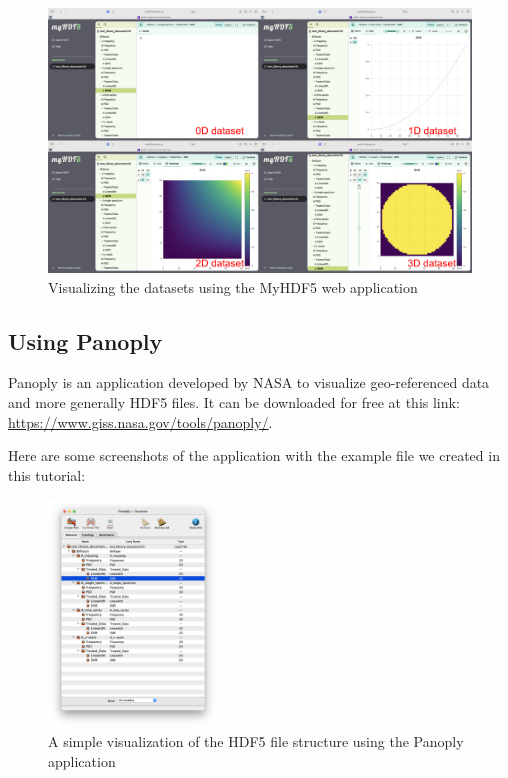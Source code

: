 \documentclass{article}
\begin{document}
\begin{figure}[H]
    \centering
    \includegraphics[width=\textwidth]{img/MyHDF5_visualizer.png}
    \caption{Visualizing the datasets using the MyHDF5 web application} 
    \label{fig:my_hdf5_datasets}
\end{figure}

\subsection{Using Panoply}

Panoply is an application developed by NASA to visualize geo-referenced data and more generally HDF5 files. It can be downloaded for free at this link: \url{https://www.giss.nasa.gov/tools/panoply/}. 

Here are some screenshots of the application with the example file we created in this tutorial: 

\begin{figure}[H]
    \centering
    \includegraphics[width=0.4\textwidth]{img/Panoply_developed_structure.png}
    \caption{A simple visualization of the HDF5 file structure using the Panoply application} 
    \label{fig:panoply_developed_structure}
\end{figure}
\end{document}

